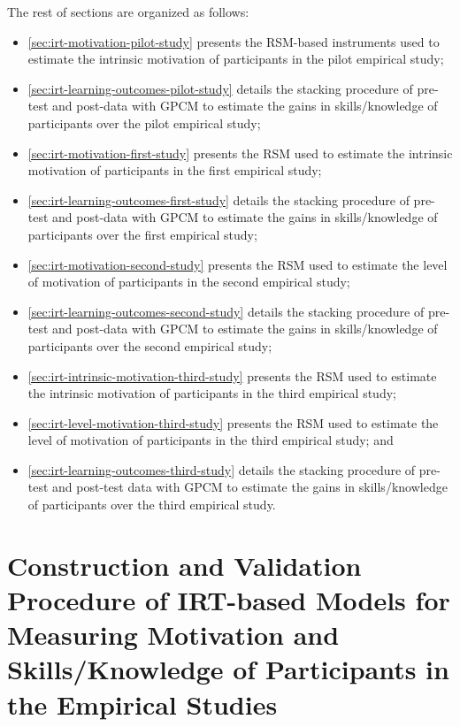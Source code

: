 The rest of sections are organized as follows:
\begin{itemize}
\item
\autoref{sec:irt-motivation-pilot-study} presents the RSM-based instruments used to estimate the intrinsic motivation of participants in the pilot empirical study;
\item
\autoref{sec:irt-learning-outcomes-pilot-study} details the stacking procedure of pre-test and post-data with GPCM to estimate the gains in skills/knowledge of participants over the pilot empirical study;
\item
\autoref{sec:irt-motivation-first-study} presents the RSM used to estimate the intrinsic motivation of participants in the first empirical study;
\item
\autoref{sec:irt-learning-outcomes-first-study} details the stacking procedure of pre-test and post-data with GPCM to estimate the gains in skills/knowledge of participants over the first empirical study;
\item
\autoref{sec:irt-motivation-second-study} presents the RSM used to estimate the level of motivation of participants in the second empirical study;
\item
\autoref{sec:irt-learning-outcomes-second-study} details the stacking procedure of pre-test and post-data with GPCM to estimate the gains in skills/knowledge of participants over the second empirical study; 
\item
\autoref{sec:irt-intrinsic-motivation-third-study} presents the RSM used to estimate the intrinsic motivation of participants in the third empirical study; 
\item
\autoref{sec:irt-level-motivation-third-study} presents the RSM used to estimate the level of motivation of participants in the third empirical study; and
\item
\autoref{sec:irt-learning-outcomes-third-study} details the stacking procedure of pre-test and post-test data with GPCM to estimate the gains in skills/knowledge of participants over the third empirical study.
\end{itemize}


\section[Construction and Validation Procedure of IRT-based Models]{Construction and Validation Procedure of IRT-based Models for Measuring Motivation and Skills/Knowledge of Participants in the Empirical Studies}
\label{sec:irt-motivation}

